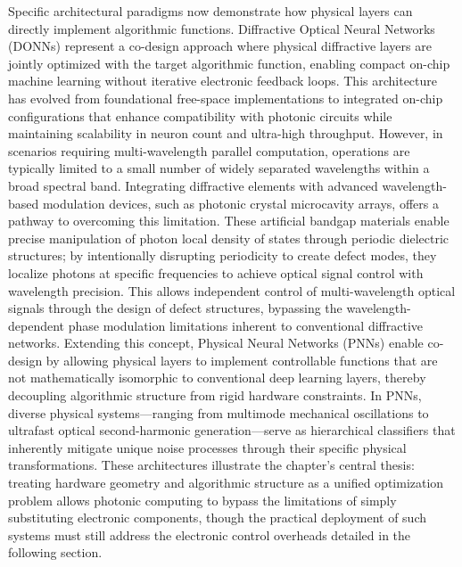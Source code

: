 Specific architectural paradigms now demonstrate how physical layers can directly implement algorithmic functions. Diffractive Optical Neural Networks (DONNs) represent a co-design approach where physical diffractive layers are jointly optimized with the target algorithmic function, enabling compact on-chip machine learning without iterative electronic feedback loops. This architecture has evolved from foundational free-space implementations to integrated on-chip configurations that enhance compatibility with photonic circuits while maintaining scalability in neuron count and ultra-high throughput. However, in scenarios requiring multi-wavelength parallel computation, operations are typically limited to a small number of widely separated wavelengths within a broad spectral band. Integrating diffractive elements with advanced wavelength-based modulation devices, such as photonic crystal microcavity arrays, offers a pathway to overcoming this limitation. These artificial bandgap materials enable precise manipulation of photon local density of states through periodic dielectric structures; by intentionally disrupting periodicity to create defect modes, they localize photons at specific frequencies to achieve optical signal control with wavelength precision. \citep{doi_10_1371_journal_pone_0341241_2b7bcccf} \citep{doi_10_1109_isset62871_2024_10779731_6ff2a9a8} This allows independent control of multi-wavelength optical signals through the design of defect structures, bypassing the wavelength-dependent phase modulation limitations inherent to conventional diffractive networks. Extending this concept, Physical Neural Networks (PNNs) enable co-design by allowing physical layers to implement controllable functions that are not mathematically isomorphic to conventional deep learning layers, thereby decoupling algorithmic structure from rigid hardware constraints. In PNNs, diverse physical systems---ranging from multimode mechanical oscillations to ultrafast optical second-harmonic generation---serve as hierarchical classifiers that inherently mitigate unique noise processes through their specific physical transformations. These architectures illustrate the chapter's central thesis: treating hardware geometry and algorithmic structure as a unified optimization problem allows photonic computing to bypass the limitations of simply substituting electronic components, though the practical deployment of such systems must still address the electronic control overheads detailed in the following section. \citep{doi_10_1002_nap2_70098_8d5f2f8a} \citep{doi_10_1038_s41586_021_04223_6_6158a5ea} \citep{doi_10_1515_nanoph_2025_0168_86a0f7aa}

